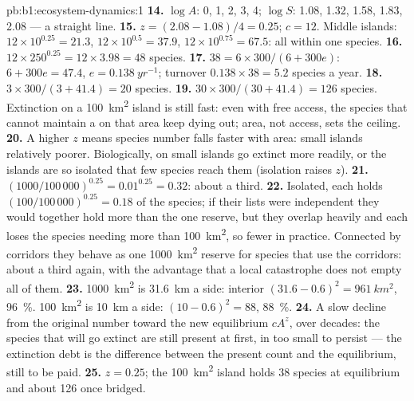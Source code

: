 \begin{solution}{pb:b1:ecosystem-dynamics:1}
\textbf{14.} $\log A$: 0, 1, 2, 3, 4; $\log S$: 1.08, 1.32, 1.58,
1.83, 2.08 --- a straight line.
\textbf{15.} $z = (2.08 - 1.08)/4 = 0.25$; $c = 12$. Middle islands:
$12\times 10^{0.25} = 21.3$, $12\times 10^{0.5} = 37.9$, $12\times
10^{0.75} = 67.5$: all within one species.
\textbf{16.} $12\times 250^{0.25} = 12\times 3.98 = 48$ species.
\textbf{17.} $38 = 6\times 300/(6 + 300e)$: $6 + 300e = 47.4$, $e =
\qty{0.138}{yr^{-1}}$; turnover $0.138\times 38 = 5.2$ species a year.
\textbf{18.} $3\times 300/(3 + 41.4) = 20$ species.
\textbf{19.} $30\times 300/(30 + 41.4) = 126$ species. Extinction on a
\qty{100}{km^2} island is still fast: even with free access, the
species that cannot maintain a  on that area keep dying
out; area, not access, sets the ceiling.
\textbf{20.} A higher $z$ means species number falls faster with
area: small islands relatively poorer. Biologically,  on
small islands go extinct more readily, or the islands are so isolated
that few species reach them (isolation raises $z$).
\textbf{21.} $(1000/100\,000)^{0.25} = 0.01^{0.25} = 0.32$: about a
third.
\textbf{22.} Isolated, each holds $(100/100\,000)^{0.25} = 0.18$ of the
species; if their lists were independent they would together hold
more than the one reserve, but they overlap heavily and each loses
the species needing more than \qty{100}{km^2}, so fewer in practice.
Connected by corridors they behave as one \qty{1000}{km^2} reserve for
species that use the corridors: about a third again, with the
advantage that a local catastrophe does not empty all of them.
\textbf{23.} \qty{1000}{km^2} is \qty{31.6}{km} a side: interior
$(31.6 - 0.6)^2 = \qty{961}{km^2}$, \qty{96}{\%}. \qty{100}{km^2} is
\qty{10}{km} a side: $(10 - 0.6)^2 = 88$, \qty{88}{\%}.
\textbf{24.} A slow decline from the original number toward the new
equilibrium $cA^z$, over decades: the species that will go extinct
are still present at first, in  too small to persist ---
the extinction debt is the difference between the present count and
the equilibrium, still to be paid.
\textbf{25.} $z = 0.25$; the \qty{100}{km^2} island holds \num{38}
species at equilibrium and about \num{126} once bridged.
\end{solution}
